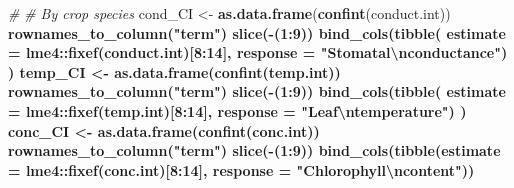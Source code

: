 \documentclass[]{scrartcl}
\newenvironment{Shaded}{\begin{snugshade}}{\end{snugshade}}
\newcommand{\CharTok}[1]{\textcolor[rgb]{0.31,0.60,0.02}{#1}}
\newcommand{\CommentTok}[1]{\textcolor[rgb]{0.56,0.35,0.01}{\textit{#1}}}
\newcommand{\DataTypeTok}[1]{\textcolor[rgb]{0.13,0.29,0.53}{#1}}
\newcommand{\DecValTok}[1]{\textcolor[rgb]{0.00,0.00,0.81}{#1}}
\newcommand{\KeywordTok}[1]{\textcolor[rgb]{0.13,0.29,0.53}{\textbf{#1}}}
\newcommand{\NormalTok}[1]{#1}
\newcommand{\OperatorTok}[1]{\textcolor[rgb]{0.81,0.36,0.00}{\textbf{#1}}}
\newcommand{\StringTok}[1]{\textcolor[rgb]{0.31,0.60,0.02}{#1}}
\begin{document}
\begin{Shaded}
\begin{Highlighting}[]
{{{{{{{{{{{{{\CommentTok{#}
\CommentTok{# By crop species }
\NormalTok{  cond_CI <-}\StringTok{ }\KeywordTok{as.data.frame}\NormalTok{(}\KeywordTok{confint}\NormalTok{(conduct.int)) }\OperatorTok{%
\StringTok{                      }\KeywordTok{rownames_to_column}\NormalTok{(}\StringTok{"term"}\NormalTok{) }\OperatorTok{%
\StringTok{                        }\KeywordTok{slice}\NormalTok{(}\OperatorTok{-}\NormalTok{(}\DecValTok{1}\OperatorTok{:}\DecValTok{9}\NormalTok{)) }\OperatorTok{%
\StringTok{                    }\KeywordTok{bind_cols}\NormalTok{(}\KeywordTok{tibble}\NormalTok{(}
                                \DataTypeTok{estimate =}\NormalTok{ lme4}\OperatorTok{::}\KeywordTok{fixef}\NormalTok{(conduct.int)[}\DecValTok{8}\OperatorTok{:}\DecValTok{14}\NormalTok{], }
                                \DataTypeTok{response =} \StringTok{"Stomatal}\CharTok{\textbackslash{}n}\StringTok{conductance"}\NormalTok{) ) }
\NormalTok{  temp_CI <-}\StringTok{ }\KeywordTok{as.data.frame}\NormalTok{(}\KeywordTok{confint}\NormalTok{(temp.int)) }\OperatorTok{%
\StringTok{                      }\KeywordTok{rownames_to_column}\NormalTok{(}\StringTok{"term"}\NormalTok{) }\OperatorTok{%
\StringTok{                        }\KeywordTok{slice}\NormalTok{(}\OperatorTok{-}\NormalTok{(}\DecValTok{1}\OperatorTok{:}\DecValTok{9}\NormalTok{)) }\OperatorTok{%
\StringTok{                    }\KeywordTok{bind_cols}\NormalTok{(}\KeywordTok{tibble}\NormalTok{(}
                                \DataTypeTok{estimate =}\NormalTok{ lme4}\OperatorTok{::}\KeywordTok{fixef}\NormalTok{(temp.int)[}\DecValTok{8}\OperatorTok{:}\DecValTok{14}\NormalTok{], }
                                \DataTypeTok{response =} \StringTok{"Leaf}\CharTok{\textbackslash{}n}\StringTok{temperature"}\NormalTok{) ) }
\NormalTok{  conc_CI <-}\StringTok{ }\KeywordTok{as.data.frame}\NormalTok{(}\KeywordTok{confint}\NormalTok{(conc.int)) }\OperatorTok{%
\StringTok{                      }\KeywordTok{rownames_to_column}\NormalTok{(}\StringTok{"term"}\NormalTok{) }\OperatorTok{%
\StringTok{                        }\KeywordTok{slice}\NormalTok{(}\OperatorTok{-}\NormalTok{(}\DecValTok{1}\OperatorTok{:}\DecValTok{9}\NormalTok{)) }\OperatorTok{%
\StringTok{                 }\KeywordTok{bind_cols}\NormalTok{(}\KeywordTok{tibble}\NormalTok{(}\DataTypeTok{estimate =}\NormalTok{ lme4}\OperatorTok{::}\KeywordTok{fixef}\NormalTok{(conc.int)[}\DecValTok{8}\OperatorTok{:}\DecValTok{14}\NormalTok{], }
                                  \DataTypeTok{response =} \StringTok{"Chlorophyll}\CharTok{\textbackslash{}n}\StringTok{content"}\NormalTok{))}
}}}}}}}}}}}}}}}}}}}}}}
\end{Highlighting}
\end{Shaded}
\end{document}
